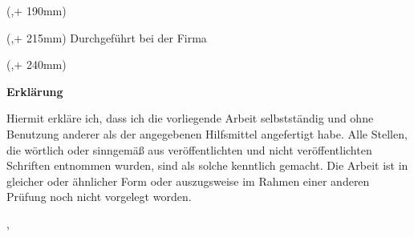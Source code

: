\begin{textblock*}{\seitenbreite}(\bindekorrektur,\seitenanfang + 190mm)
  \centering\Large 
  \textsf{\hsmadatum}
\end{textblock*}

\begin{textblock*}{\seitenbreite}(\bindekorrektur,\seitenanfang + 215mm)
  \centering\Large 
  \textsf{Durchgeführt bei der Firma \hsmafirma}
\end{textblock*}

\begin{textblock*}{\seitenbreite}(\bindekorrektur,\seitenanfang + 240mm)
  \centering\Large\sf
  \hsmabetreuer\\
  \vspace{2mm}
  \hsmazweitkorrektor
\end{textblock*}

\null
\newpage

\titlehead{\hsmatyp im \hsmastudiengang}
\subject{}
\title{\hsmatitel}
\author{\hsmaauthor}
\date{\small{\hsmadatum}}


\textsf{\large\textbf{Erklärung}}

Hiermit erkläre ich, dass ich die vorliegende Arbeit selbstständig und ohne Benutzung anderer als der angegebenen Hilfsmittel angefertigt habe. Alle Stellen, die wörtlich oder sinngemäß aus veröffentlichten und nicht veröffentlichten Schriften entnommen wurden, sind als solche kenntlich gemacht. Die Arbeit ist in gleicher oder ähnlicher Form oder auszugsweise im Rahmen einer anderen Prüfung noch nicht vorgelegt worden.

\vspace{1cm}
\hsmaort, \hsmadatum \\

\vspace{1.2cm}						                                      
\hsmaauthor
